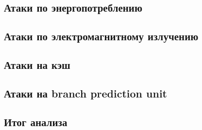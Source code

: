 \subsection{Атаки по энергопотреблению}
\clearpage

\subsection{Атаки по электромагнитному излучению}
\clearpage

\subsection{Атаки на кэш}
\clearpage

\subsection{Атаки на branch prediction unit}
\clearpage

\subsection{Итог анализа}
\clearpage
